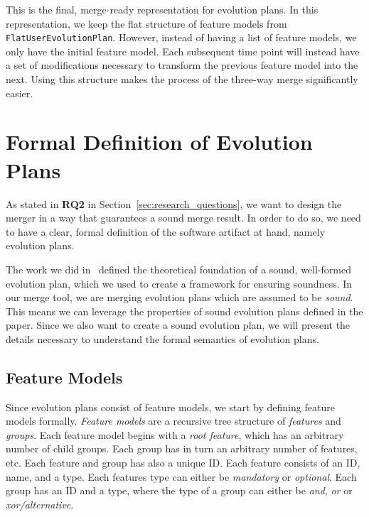 \documentclass[a4paper,english]{ifimaster}
\begin{document}
This is the final, merge-ready representation for evolution plans. In this representation, we keep the flat structure of feature models from \texttt{Flat\-User\-Evolution\-Plan}. However, instead of having a list of feature models, we only have the initial feature model. Each subsequent time point will instead have a set of modifications necessary to transform the previous feature model into the next. Using this structure makes the process of the three-way merge significantly easier.

\section{Formal Definition of Evolution Plans}%
\label{sec:formal_definition_of_evolution_plans}

As stated in \textbf{RQ2} in Section~\vref{sec:research_questions}, we want to design the merger in a way that guarantees a sound merge result. In order to do so, we need to have a clear, formal definition of the software artifact at hand, namely evolution plans.

The work we did in~\cite{cite:consistency_preserving_evolution_planning} defined the theoretical foundation of a sound, well-formed evolution plan, which we used to create a framework for ensuring soundness. In our merge tool, we are merging evolution plans which are assumed to be \textit{sound}. This means we can leverage the properties of sound evolution plans defined in the paper. Since we also want to create a sound evolution plan, we will present the details necessary to understand the formal semantics of evolution plans.

\subsection{Feature Models}%
\label{sub:feature_models}

Since evolution plans consist of feature models, we start by defining feature models formally. \textit{Feature models} are a recursive tree structure of \textit{features} and \textit{groups}. Each feature model begins with a \textit{root feature}, which has an arbitrary number of child groups. Each group has in turn an arbitrary number of features, etc. Each feature and group has also a unique ID. Each feature consists of an ID, name, and a type. Each features type can either be \textit{mandatory} or \textit{optional}. Each group has an ID and a type, where the type of a group can either be \textit{and}, \textit{or} or \textit{xor/alternative}.
\end{document}
